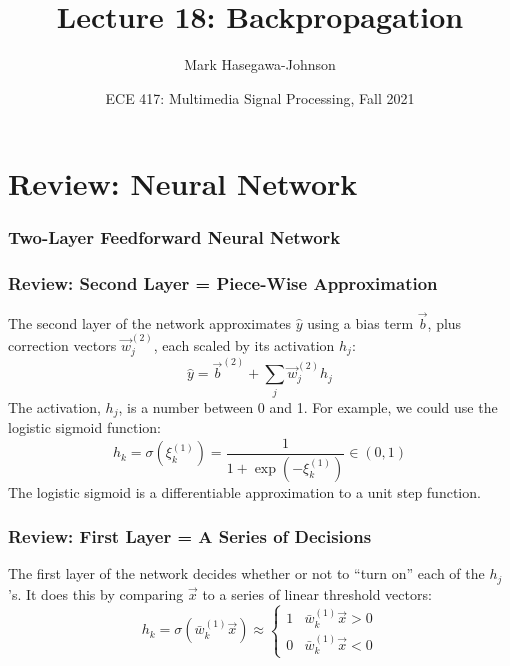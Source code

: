 \documentclass{beamer}
\title{Lecture 18: Backpropagation}
\author{Mark Hasegawa-Johnson}
\date{ECE 417: Multimedia Signal Processing, Fall 2021}
\begin{document}
\begin{frame}
  \maketitle
\end{frame}

\begin{frame}
  \tableofcontents
\end{frame}


\section[Review]{Review: Neural Network}
\setcounter{subsection}{1}

\begin{frame}
  \frametitle{Two-Layer Feedforward Neural Network}
  \begin{small}\end{small}
\end{frame}

\begin{frame}
  \frametitle{Review: Second Layer = Piece-Wise Approximation}

  The second layer of the network approximates $\hat{y}$ using a bias term $\vec{b}$,
  plus correction vectors $\vec{w}_j^{(2)}$, each scaled by its activation $h_j$:
  \[
  \hat{y} = \vec{b}^{(2)} + \sum_j \vec{w}_{j}^{(2)} h_j
  \]
  The activation, $h_j$, is a number between 0 and 1.  For example, we could
  use the logistic sigmoid function:
  \[
  h_k = \sigma\left(\xi_k^{(1)}\right)=\frac{1}{1+\exp(-\xi_k^{(1)})}\in\left(0,1\right)
  \]
  The logistic sigmoid is a differentiable approximation to a unit step function.
\end{frame}

\begin{frame}
  \frametitle{Review: First Layer = A Series of Decisions}

  The first layer of the network decides whether or not to ``turn on'' each of the
  $h_j$'s.  It does this by comparing $\vec{x}$ to a series of linear threshold vectors:
  \[
  h_k = \sigma\left(\bar{w}_k^{(1)}\vec{x}\right)\approx\begin{cases}
  1 & \bar{w}_k^{(1)}\vec{x} > 0\\
  0 & \bar{w}_k^{(1)}\vec{x} < 0
  \end{cases}
  \]
\end{frame}
\end{document}
